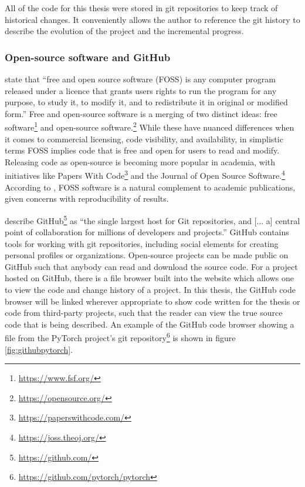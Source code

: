 \documentclass[report.tex]{subfiles}
\begin{document}
All of the code for this thesis were stored in git repositories to keep track of historical changes. It conveniently allows the author to reference the git history to describe the evolution of the project and the incremental progress.

\newpagefill

\subsubsection{Open-source software and GitHub}

\textcite{floss} state that ``free and open source software (FOSS) is any computer program released under a licence that grants users rights to run the program for any purpose, to study it, to modify it, and to redistribute it in original or modified form.'' Free and open-source software is a merging of two distinct ideas: free software\footnote{\url{https://www.fsf.org/}} and open-source software.\footnote{\url{https://opensource.org/}} While these have nuanced differences when it comes to commercial licensing, code visibility, and availability, in simplistic terms FOSS implies code that is free and open for users to read and modify. Releasing code as open-source is becoming more popular in academia, with initiatives like Papers With Code\footnote{\url{https://paperswithcode.com/}} and the Journal of Open Source Software.\footnote{\url{https://joss.theoj.org/}} According to \textcite{floss}, FOSS software is a natural complement to academic publications, given concerns with reproducibility of results.

\textcite{gitbook} describe GitHub\footnote{\url{https://github.com/}} as ``the single largest host for Git repositories, and [... a] central point of collaboration for millions of developers and projects.'' GitHub contains tools for working with git repositories, including social elements for creating personal profiles or organizations. Open-source projects can be made public on GitHub such that anybody can read and download the source code. For a project hosted on GitHub, there is a file browser built into the website which allows one to view the code and change history of a project. In this thesis, the GitHub code browser will be linked wherever appropriate to show code written for the thesis or code from third-party projects, such that the reader can view the true source code that is being described. An example of the GitHub code browser showing a file from the PyTorch project's git repository\footnote{\url{https://github.com/pytorch/pytorch}} is shown in figure \ref{fig:githubpytorch}.
\end{document}
